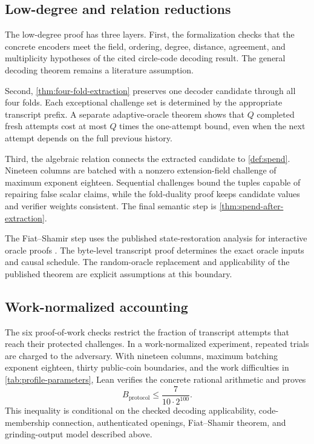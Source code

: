 \subsection{Low-degree and relation reductions}

The low-degree proof has three layers.  First, the formalization checks that
the concrete encoders meet the field, ordering, degree, distance, agreement,
and multiplicity hypotheses of the cited circle-code decoding result.  The
general decoding theorem remains a literature assumption.

Second, \cref{thm:four-fold-extraction} preserves one decoder candidate through
all four folds.  Each exceptional challenge set is determined by the
appropriate transcript prefix.  A separate adaptive-oracle theorem shows
that \(Q\) completed fresh attempts cost at most \(Q\) times the one-attempt
bound, even when the next attempt depends on the full previous history.

Third, the algebraic relation connects the extracted candidate to
\cref{def:spend}.  Nineteen columns are batched with a nonzero extension-field
challenge of maximum exponent eighteen.  Sequential challenges bound the
tuples capable of repairing false scalar claims, while the fold-duality proof
keeps candidate values and verifier weights consistent.  The final semantic
step is \cref{thm:spend-after-extraction}.

The Fiat--Shamir step uses the published state-restoration analysis for
interactive oracle proofs \cite{BenSassonChiesaSpooner2016,
BlockGarretaKatzThalerTiwariZajac2023,CarmonEtAl2026Stwo}.  The byte-level
transcript proof determines the exact oracle inputs and causal schedule.  The
random-oracle replacement and applicability of the published theorem are
explicit assumptions at this boundary.

\subsection{Work-normalized accounting}

The six proof-of-work checks restrict the fraction of transcript attempts that
reach their protected challenges.  In a work-normalized experiment, repeated
trials are charged to the adversary.  With nineteen columns, maximum batching
exponent eighteen, thirty public-coin boundaries, and the work difficulties
in \cref{tab:profile-parameters}, Lean verifies the concrete rational
arithmetic and proves
\begin{equation}
  B_{\mathrm{protocol}}
  \leq \frac{7}{10\cdot2^{100}}.
  \label{eq:core-budget}
\end{equation}
This inequality is conditional on the checked decoding applicability,
code-membership connection, authenticated openings, Fiat--Shamir theorem,
and grinding-output model described above.

